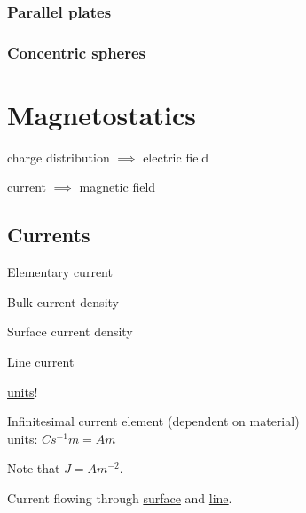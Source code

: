 \documentclass{article}
\begin{document}
\subsubsection{Parallel plates}

\subsubsection{Concentric spheres}

\newpage

\section{Magnetostatics}

charge distribution $\implies$ electric field

current $\implies$ magnetic field

\subsection{Currents}

Elementary current

Bulk current density

Surface current density

Line current

\underline{units}!

Infinitesimal current element (dependent on material)\\
units: $Cs^{-1}m=Am$

Note that $J=Am^{-2}$.

Current flowing through \underline{surface} and \underline{line}.
\end{document}
